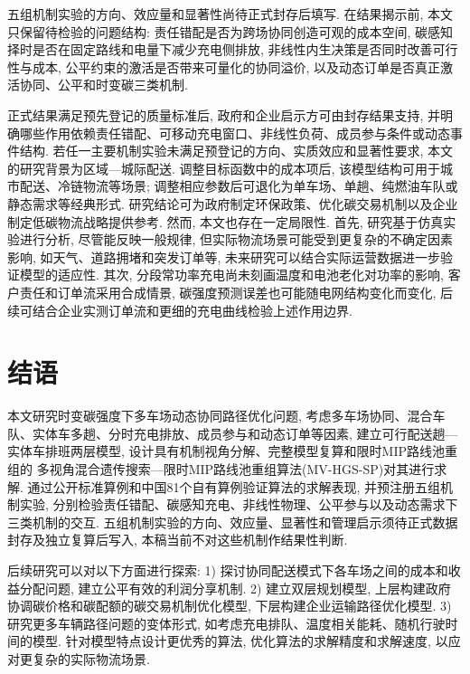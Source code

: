 \documentclass{setp-new}
\begin{document}
五组机制实验的方向、效应量和显著性尚待正式封存后填写.
在结果揭示前, 本文只保留待检验的问题结构:
责任错配是否为跨场协同创造可观的成本空间,
碳感知择时是否在固定路线和电量下减少充电侧排放,
非线性内生决策是否同时改善可行性与成本,
公平约束的激活是否带来可量化的协同溢价,
以及动态订单是否真正激活协同、公平和时变碳三类机制.

正式结果满足预先登记的质量标准后, 政府和企业启示方可由封存结果支持,
并明确哪些作用依赖责任错配、可移动充电窗口、非线性负荷、成员参与条件或动态事件结构.
若任一主要机制实验未满足预登记的方向、实质效应和显著性要求,
本文的研究背景为区域—城际配送. 调整目标函数中的成本项后, 该模型结构可用于城市配送、冷链物流等场景;
调整相应参数后可退化为单车场、单趟、纯燃油车队或静态需求等经典形式.
研究结论可为政府制定环保政策、优化碳交易机制以及企业制定低碳物流战略提供参考.
然而, 本文也存在一定局限性.
首先, 研究基于仿真实验进行分析, 尽管能反映一般规律,
但实际物流场景可能受到更复杂的不确定因素影响,
如天气、道路拥堵和突发订单等,
未来研究可以结合实际运营数据进一步验证模型的适应性.
其次, 分段常功率充电尚未刻画温度和电池老化对功率的影响,
客户责任和订单流采用合成情景,
碳强度预测误差也可能随电网结构变化而变化,
后续可结合企业实测订单流和更细的充电曲线检验上述作用边界.

\section{结语}

本文研究时变碳强度下多车场动态协同路径优化问题,
考虑多车场协同、混合车队、实体车多趟、分时充电排放、成员参与和动态订单等因素,
建立可行配送趟—实体车排班两层模型,
设计具有机制视角分解、完整模型复算和限时MIP路线池重组的
多视角混合遗传搜索—限时MIP路线池重组算法(MV-HGS-SP)对其进行求解.
通过公开标准算例和中国81个自有算例验证算法的求解表现,
并预注册五组机制实验,
分别检验责任错配、碳感知充电、非线性物理、公平参与以及动态需求下三类机制的交互.
五组机制实验的方向、效应量、显著性和管理启示须待正式数据封存及独立复算后写入,
本稿当前不对这些机制作结果性判断.

后续研究可以对以下方面进行探索:
1) 探讨协同配送模式下各车场之间的成本和收益分配问题,
建立公平有效的利润分享机制.
2) 建立双层规划模型,
上层构建政府协调碳价格和碳配额的碳交易机制优化模型,
下层构建企业运输路径优化模型.
3) 研究更多车辆路径问题的变体形式,
如考虑充电排队、温度相关能耗、随机行驶时间的模型.
针对模型特点设计更优秀的算法,
优化算法的求解精度和求解速度, 以应对更复杂的实际物流场景.

\end{document}
